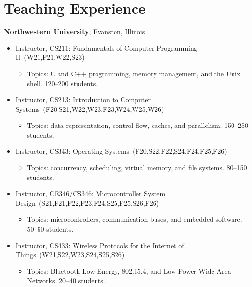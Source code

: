 \documentclass{article}
\begin{document}
\section*{Teaching Experience}
\vspace{-6pt}
{\bf Northwestern University}, Evanston, Illinois
\vspace{-6pt}
\begin{itemize}
  \item[] Instructor, CS211: Fundamentals of Computer Programming II~(W21,F21,W22,S23)
    \vspace{-\topsep}
    \vspace{\itemsep}
    \begin{itemize}
      \item Topics: C and C++ programming, memory management, and the Unix shell. 120--200 students.
    \end{itemize}
  \item[] Instructor, CS213: Introduction to Computer Systems~(F20,S21,W22,W23,F23,W24,W25,W26)
    \vspace{-\topsep}
    \vspace{\itemsep}
    \begin{itemize}
      \item Topics: data representation, control flow, caches, and parallelism. 150--250 students.
    \end{itemize}
  \item[] Instructor, CS343: Operating Systems~(F20,S22,F22,S24,F24,F25,F26)
    \vspace{-\topsep}
    \vspace{\itemsep}
    \begin{itemize}
      \item Topics: concurrency, scheduling, virtual memory, and file systems. 80--150 students.
    \end{itemize}
  \item[] Instructor, CE346/CS346: Microcontroller System Design~(S21,F21,F22,F23,F24,S25,F25,S26,F26)
    \vspace{-\topsep}
    \vspace{\itemsep}
    \begin{itemize}
      \item Topics: microcontrollers, communication buses, and embedded software. 50--60 students.
    \end{itemize}
  \item[] Instructor, CS433: Wireless Protocols for the Internet of Things~(W21,S22,W23,S24,S25,S26)
    \vspace{-\topsep}
    \vspace{\itemsep}
    \begin{itemize}
      \item Topics: Bluetooth Low-Energy, 802.15.4, and Low-Power Wide-Area Networks. 20--40 students.
    \end{itemize}
\end{itemize}
\end{document}
